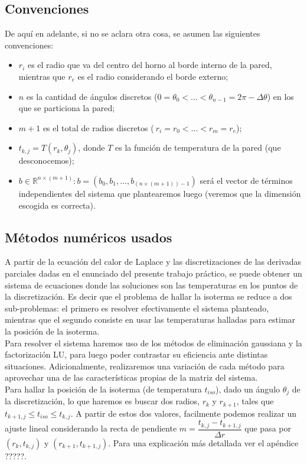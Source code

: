 \subsection{Convenciones}
De aquí en adelante, si no se aclara otra cosa, se asumen las siguientes convenciones:
\begin{itemize}
\item$r_i$ es el radio que va del centro del horno al borde interno de la pared, mientras que $r_e$ es el radio considerando el borde externo;
\item$n$ es la cantidad de ángulos discretos ($0=\theta_0 <\hdots< \theta_{n-1} = 2\pi - \Delta \theta$) en los que se particiona la pared;
\item$m+1$ es el total de radios discretos ($~{r_i=r_0<\hdots<r_m=r_e}$); 
\item$t_{k,j} = T(r_k, \theta_j)$, donde $T$ es la función de temperatura de la pared (que desconocemos);
\item$b\in \mathbb{R}^{n\times (m+1)}: b = (b_0, b_1, \hdots, b_{(n\times (m+1))-1})$ será el vector de términos independientes del sistema que plantearemos luego (veremos que la dimensión escogida es correcta). 
\end{itemize}
\subsection{Métodos numéricos usados}
A partir de la ecuación del calor de Laplace y las discretizaciones de las derivadas parciales dadas en el enunciado del presente trabajo práctico, se puede obtener un sistema de ecuaciones donde las soluciones son las temperaturas en los puntos de la discretización. 
Es decir que el problema de hallar la isoterma se reduce a dos sub-problemas: el primero es resolver efectivamente el sistema planteado, mientras que el segundo consiste en usar las temperaturas halladas para estimar la posición de la isoterma.\\
Para resolver el sistema haremos uso de los métodos de eliminación gaussiana y la factorización LU, para luego poder contrastar su eficiencia ante distintas situaciones. Adicionalmente, realizaremos una variación de cada método para aprovechar una de las características propias de la matriz del sistema.\\
Para hallar la posición de la isoterma (de temperatura $t_{iso}$), dado un ángulo $\theta_j$ de la discretización, lo que haremos es buscar dos radios, $r_k$ y $r_{k+1}$, tales que $t_{k+1,j} \leq t_{iso} \leq t_{k, j}$. A partir de estos dos valores, facilmente podemos realizar un ajuste lineal considerando la recta de pendiente $m = \dfrac{t_{k,j}-t_{k+1,j}}{\Delta r}$ que pasa por $(r_k,t_{k,j})$ y $(r_{k+1}, t_{k+1,j})$. Para una explicación más detallada ver el apéndice ?????.

